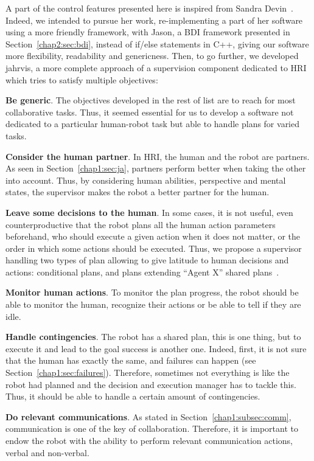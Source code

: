 \documentclass[a4paper,11pt,twoside]{StyleThese}
\begin{document}
A part of the control features presented here is inspired from Sandra Devin~\cite{devin_2017_decisional}. Indeed, we intended to pursue her work, re-implementing a part of her software using a more friendly framework, \ie with Jason, a BDI framework presented in Section~\ref{chap2:sec:bdi}, instead of if/else statements in C++, giving our software more flexibility, readability and genericness.
Then, to go further, we developed \acrshort{jahrvis}, a more complete approach of a supervision component dedicated to HRI which tries to satisfy multiple objectives:

\begin{bulletList}
	\item \textbf{Be generic}. The objectives developed in the rest of list are to reach for most collaborative tasks. Thus, it seemed essential for us to develop a software not dedicated to a particular human-robot task but able to handle plans for varied tasks. 
	\item \textbf{Consider the human partner}. In HRI, the human and the robot are partners. As seen in Section~\ref{chap1:sec:ja}, partners perform better when taking the other into account. Thus, by considering human abilities, perspective and mental states, the supervisor makes the robot a better partner for the human.
	\item \textbf{Leave some decisions to the human}. In some cases, it is not useful, even counterproductive that the robot plans all the human action parameters beforehand, who should execute a given action when it does not matter, or the order in which some actions should be executed. Thus, we propose a supervisor handling two types of plan allowing to give latitude to human decisions and actions: conditional plans, and plans extending ``Agent X'' shared plans~\cite{devin_2017_decisions}.
	\item \textbf{Monitor human actions}. To monitor the plan progress, the robot should be able to monitor the human, \ie recognize their actions or be able to tell if they are idle.
	\item \textbf{Handle contingencies}. The robot has a shared plan, this is one thing, but to execute it and lead to the goal success is another one. Indeed, first, it is not sure that the human has exactly the same, and failures can happen (see Section~\ref{chap1:sec:failures}). Therefore, sometimes not everything is like the robot had planned and the decision and execution manager has to tackle this. Thus, it should be able to handle a certain amount of contingencies.
	\item \textbf{Do relevant communications}. As stated in Section~\ref{chap1:subsec:comm}, communication is one of the key of collaboration. Therefore, it is important to endow the robot with the ability to perform relevant communication actions, verbal and non-verbal.

\end{bulletList}
\end{document}
